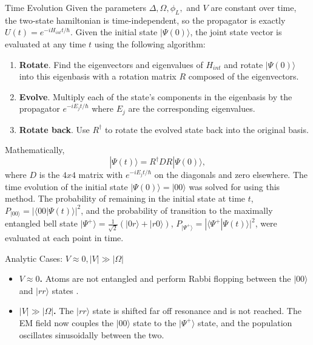 \documentclass[final]{beamer}
\newlength{\colwidth}
\begin{document}
\begin{frame}[t]
\begin{columns}[t]
\begin{column}{\colwidth}
  \begin{block}{Time Evolution}
    Given the parameters $\Delta, \Omega, \phi_L,$ and $V$ are constant over time, the two-state hamiltonian is time-independent,
    so the propagator is exactly $U(t) = e^{-iH_{int}t/\hbar}$. Given the initial state $|\Psi(0)\rangle$, the joint
    state vector is evaluated at any time $t$ using the following algorithm:
    \begin{enumerate}
      \item \textbf{Rotate}. Find the eigenvectors and eigenvalues of $H_{int}$ and rotate $|\Psi(0)\rangle$ into this eigenbasis
        with a rotation matrix $R$ composed of the eigenvectors.
      \item \textbf{Evolve}. Multiply each of the state's components in the eigenbasis by the propagator $e^{-iE_jt/\hbar}$
      where $E_j$ are the corresponding eigenvalues.
      \item \textbf{Rotate back}. Use $R^\dag$ to rotate the evolved state back into the original basis.
    \end{enumerate}
    Mathematically,
    $$
    |\Psi(t)\rangle = R^\dag D R|\Psi(0)\rangle,
    $$
    where $D$ is the $4x4$ matrix with $e^{-iE_jt/\hbar}$ on the diagonals and zero elsewhere. The time evolution of the initial
    state $|\Psi(0)\rangle=|00\rangle$ was solved for using this method. The probability of remaining in the initial state at
    time $t$, $P_{|00\rangle}=|\langle 00 | \Psi(t) \rangle|^2$, and the probability of transition to the maximally entangled
    bell state $|\Psi^+ \rangle = \frac{1}{\sqrt{2}}(|0r\rangle + |r0\rangle)$,
    $P_{|\Psi^+\rangle}=|\langle \Psi^+ | \Psi(t) \rangle|^2$, were evaluated at each point in time.

  \end{block}

  \begin{block}{Analytic Cases: $V \approx 0, |V| \gg |\Omega|$}

    \begin{itemize}
      \item \textbf{$V \approx 0$.} Atoms are not entangled and perform Rabbi flopping between the $|00\rangle$ and $|rr\rangle$
      states \cite{Gaetan2009}.
      \item \textbf{$|V| \gg |\Omega|$.} The $|rr\rangle$ state is shifted far off resonance and is not reached. The EM field
      now couples the $|00\rangle$ state to the $|\Psi^+\rangle$ state, and the population oscillates sinusoidally between the two.
    \end{itemize}





\end{block}
\end{column}
\end{columns}
\end{frame}
\end{document}
